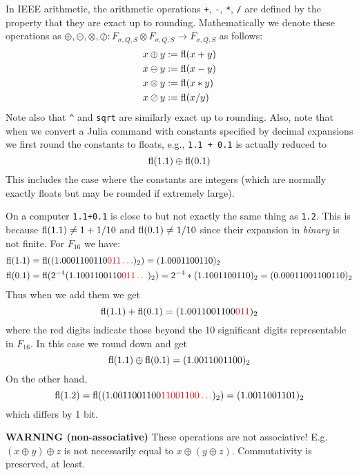 In IEEE arithmetic, the arithmetic operations \texttt{+}, \texttt{-}, \texttt{*}, \texttt{/} are defined by the property that they are exact up to rounding.  Mathematically we denote these operations as $\ensuremath{\oplus}, \ensuremath{\ominus}, \ensuremath{\otimes}, \ensuremath{\oslash} : F_{\ensuremath{\sigma},Q,S} \ensuremath{\otimes} F_{\ensuremath{\sigma},Q,S} \ensuremath{\rightarrow} F_{\ensuremath{\sigma},Q,S}$ as follows:
\begin{align*}
x \ensuremath{\oplus} y &:= {\rm fl}(x+y) \\
x \ensuremath{\ominus} y &:= {\rm fl}(x - y) \\
x \ensuremath{\otimes} y &:= {\rm fl}(x * y) \\
x \ensuremath{\oslash} y &:= {\rm fl}(x / y)
\end{align*}
Note also that  \texttt{\^{}} and \texttt{sqrt} are similarly exact up to rounding. Also, note that when we convert a Julia command with constants specified by decimal expansions we first round the constants to floats, e.g., \texttt{1.1 + 0.1} is actually reduced to
\[
{\rm fl}(1.1) \ensuremath{\oplus} {\rm fl}(0.1)
\]
This includes the case where the constants are integers (which are normally exactly floats but may be rounded if extremely large).

\begin{example} On a computer \texttt{1.1+0.1} is close to but not exactly the same thing as \texttt{1.2}. This is because ${\rm fl}(1.1) \ensuremath{\neq} 1+1/10$ and ${\rm fl}(0.1) \ensuremath{\neq} 1/10$ since their expansion in \emph{binary} is not finite. For $F_{16}$ we have:
\begin{align*}
{\rm fl}(1.1) &= {\rm fl}((1.0001100110{\color{red} 011\ldots})_2) =  (1.0001100110)_2 \\
{\rm fl}(0.1) &= {\rm fl}(2^{-4}(1.1001100110{\color{red} 011\ldots})_2) =  2^{-4} * (1.1001100110)_2 = (0.00011001100110)_2
\end{align*}
Thus when we add them we get
\[
{\rm fl}(1.1) + {\rm fl}(0.1) = (1.0011001100{\color{red} 011})_2
\]
where the red digits indicate those beyond the 10 significant digits representable in $F_{16}$. In this case we round down and get
\[
{\rm fl}(1.1) \ensuremath{\oplus} {\rm fl}(0.1) = (1.0011001100)_2
\]
On the other hand,
\[
{\rm fl}(1.2) = {\rm fl}((1.0011001100{\color{red} 11001100\ldots})_2) = (1.0011001101)_2
\]
which differs by 1 bit. \end{example}

\textbf{WARNING (non-associative)} These operations are not associative! E.g. $(x \ensuremath{\oplus} y) \ensuremath{\oplus} z$ is not necessarily equal to $x \ensuremath{\oplus} (y \ensuremath{\oplus} z)$. Commutativity is preserved, at least.

